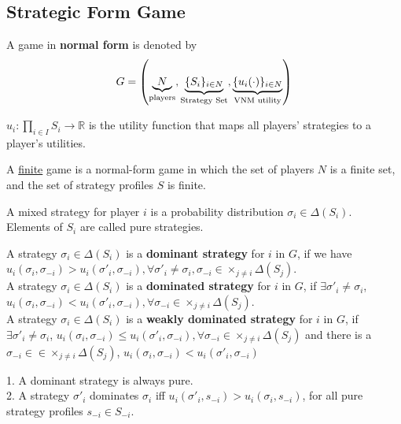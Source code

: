 \documentclass[11pt]{elegantbook}
\begin{document}
\subsection{Strategic Form Game}
\begin{definition}
    \normalfont
    A game in \textbf{normal form} is denoted by $$G =\left(\underbrace{N}_{\textnormal{players}},\underbrace{\{S_i\}_{i\in N}}_{\textnormal{Strategy Set}},\underbrace{\{u_i(\cdot)\}_{i\in N}}_{\textnormal{VNM utility}}\right)$$

    $u_i:\prod_{i\in I}S_i \rightarrow \mathbb{R}$ is the utility function that maps all players' strategies to a player's utilities.

    A \underline{finite} game is a normal-form game in which the set of players $N$ is a finite set, and the set of strategy profiles $S$ is finite.
\end{definition}

\begin{definition}
\normalfont
A mixed strategy  for player $i$ is a probability distribution $\sigma_i\in\Delta(S_i)$.\\
Elements of $S_i$ are called pure strategies.
\end{definition}

\begin{definition}
    \normalfont
    A strategy $\sigma_i\in \Delta(S_i)$ is a \textbf{dominant strategy} for $i$ in $G$, if we have $u_i(\sigma_i,\sigma_{-i})> u_i(\sigma'_i,\sigma_{-i}), \forall \sigma'_i\neq \sigma_i, \sigma_{-i}\in\times_{j\neq i}\Delta(S_j)$.\\
    A strategy $\sigma_i\in \Delta(S_i)$ is a \textbf{dominated strategy} for $i$ in $G$, if $\exists \sigma'_i\neq \sigma_i$, $u_i(\sigma_i,\sigma_{-i})<u_i(\sigma'_i,\sigma_{-i}), \forall \sigma_{-i}\in\times_{j\neq i}\Delta(S_j)$.\\
    A strategy $\sigma_i\in \Delta(S_i)$ is a \textbf{weakly dominated strategy} for $i$ in $G$, if $\exists \sigma'_i\neq \sigma_i$, $u_i(\sigma_i,\sigma_{-i})\leq u_i(\sigma'_i,\sigma_{-i}), \forall \sigma_{-i}\in\times_{j\neq i}\Delta(S_j)$ and there is a $\sigma_{-i}\in \in\times_{j\neq i}\Delta(S_j)$, $u_i(\sigma_i,\sigma_{-i})< u_i(\sigma'_i,\sigma_{-i})$
\end{definition}

\begin{lemma}
    1. A dominant strategy is always pure.\\
    2. A strategy $\sigma'_i$ dominates $\sigma_i$ iff $u_i(\sigma'_i,s_{-i})> u_i(\sigma_i,s_{-i})$, for all pure strategy profiles $s_{-i}\in S_{-i}$.
\end{lemma}
\end{document}

